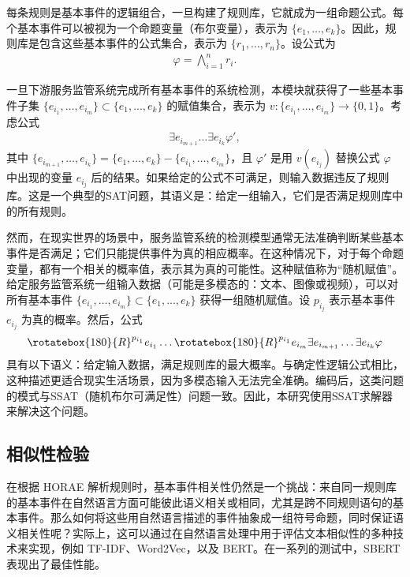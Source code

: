每条规则是基本事件的逻辑组合，一旦构建了规则库，它就成为一组命题公式。每个基本事件可以被视为一个命题变量（布尔变量），表示为 $\{e_1, \dots, e_k\}$。因此，规则库是包含这些基本事件的公式集合，表示为 $\{r_1, \dots, r_n\}$。设公式为
\begin{align*}
\varphi = \bigwedge_{i=1}^{n} r_i.
\end{align*}

一旦下游服务监管系统完成所有基本事件的系统检测，本模块就获得了一些基本事件子集 $\{e_{i_1}, \dots, e_{i_m}\} \subset \{e_1, ..., e_k\}$ 的赋值集合，表示为 $v: \{e_{i_1}, \dots, e_{i_m}\} \to \{0,1\}$。考虑公式
\begin{align*}
\exists e_{i_{m+1}} \dots \exists e_{i_{k}} \varphi',
\end{align*}
其中 $\{e_{i_{m+1}},\dots,e_{i_{k}}\}=\{e_1,\dots,e_k\} - \{e_{i_1}, \dots, e_{i_m}\}$，且 $\varphi'$ 是用 $v(e_{i_j})$ 替换公式 $\varphi$ 中出现的变量 $e_{i_j}$ 后的结果。如果给定的公式不可满足，则输入数据违反了规则库。这是一个典型的SAT问题，其语义是：给定一组输入，它们是否满足规则库中的所有规则。

然而，在现实世界的场景中，服务监管系统的检测模型通常无法准确判断某些基本事件是否满足；它们只能提供事件为真的相应概率。在这种情况下，对于每个命题变量，都有一个相关的概率值，表示其为真的可能性。这种赋值称为“随机赋值”。给定服务监管系统一组输入数据（可能是多模态的：文本、图像或视频），可以对所有基本事件 $\{e_{i_1}, \dots, e_{i_m}\} \subset \{e_1, ..., e_k\}$ 获得一组随机赋值。设 $p_{i_j}$ 表示基本事件 $e_{i_j}$ 为真的概率。然后，公式
\begin{align*}
    \rotatebox{180}{R}^{p_{i_1}} e_{i_1} \dots \rotatebox{180}{R}^{p_{i_1}} e_{i_m}
    \exists e_{i_{m+1}} \dots \exists e_{i_k}
    \varphi
\end{align*}
具有以下语义：给定输入数据，满足规则库的最大概率。与确定性逻辑公式相比，这种描述更适合现实生活场景，因为多模态输入无法完全准确。编码后，这类问题的模式与SSAT（随机布尔可满足性）问题一致。因此，本研究使用SSAT求解器来解决这个问题。

\subsection{相似性检验}

在根据 HORAE 解析规则时，基本事件相关性仍然是一个挑战：来自同一规则库 的基本事件在自然语言方面可能彼此语义相关或相同，尤其是跨不同规则语句的基本事件。那么如何将这些用自然语言描述的事件抽象成一组符号命题，同时保证语义相关性呢？实际上，这可以通过在自然语言处理中用于评估文本相似性的多种技术来实现，例如 TF-IDF、Word2Vec，以及 BERT。在一系列的测试中，SBERT 表现出了最佳性能。

